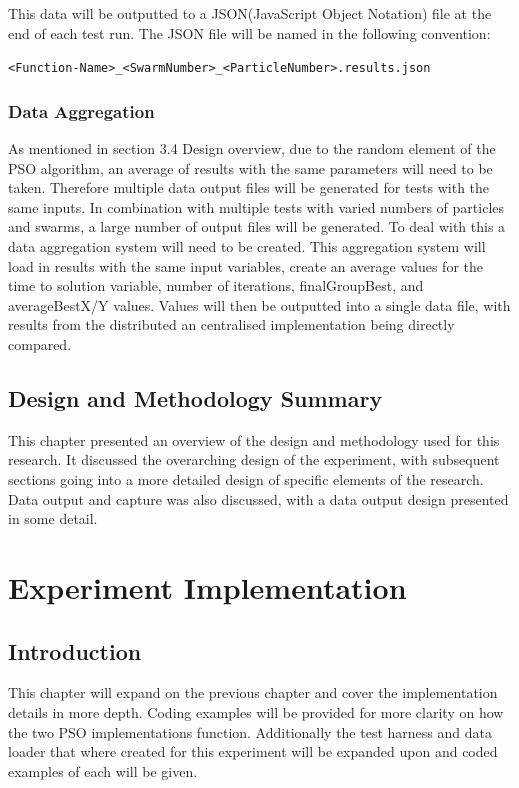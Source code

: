 \documentclass[oneside,12pt]{book}
\begin{document}
This data will be outputted to a JSON(JavaScript Object Notation) file at the end of each test run. The JSON file will be named in the following convention:

\verb|<Function-Name>_<SwarmNumber>_<ParticleNumber>.results.json|


\subsection{Data Aggregation}
As mentioned in section 3.4 Design overview, due to the random element of the PSO algorithm, an average of results with the same parameters will need to be taken. Therefore multiple data output files will be generated for tests with the same inputs. In combination with multiple tests with varied numbers of particles and swarms, a large number of output files will be generated. To deal with this a data aggregation system will need to be created. This aggregation system will load in results with the same input variables, create an average values for the time to solution variable, number of iterations, finalGroupBest, and averageBestX/Y values. Values will then be outputted  into a single data file, with results from the distributed an centralised implementation being directly compared.

\section{Design and Methodology Summary}
This chapter presented an overview of the design and methodology used for this research. It discussed the overarching design of the experiment, with subsequent sections going into a more detailed design of specific elements of the research. Data output and capture was also discussed, with a data output design presented in some detail. 

\chapter{Experiment Implementation}

\section{Introduction}
This chapter will expand on the previous chapter and cover the implementation details in more depth. Coding examples will be provided for more clarity on how the two PSO implementations function. Additionally the test harness and data loader that where created for this experiment will be expanded upon and coded examples of each will be given.
\end{document}
